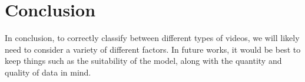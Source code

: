 \section{Conclusion}\label{sec:conclusion}
In conclusion, to correctly classify between different types of videos, we will likely need to consider a variety of different factors. In future works, it would be best to keep things such as the suitability of the model, along with the quantity and quality of data in mind.